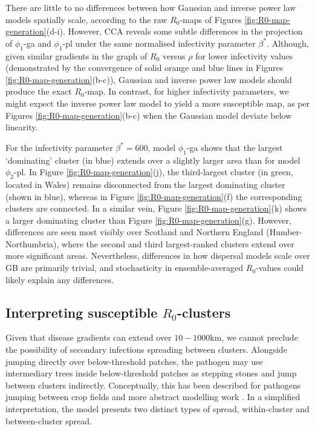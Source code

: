 There are little to no differences between how Gaussian and inverse power law models spatially scale, according to the raw $R_0$-maps of Figures \ref{fig:R0-map-generation}(d-i).
However, CCA reveals some subtle differences in the projection of $\phi_1$-ga and $\phi_1$-pl under the same normalised infectivity parameter $\beta^*$.
Although, given similar gradients in the graph of $R_0$ versus $\rho$ for lower infectivity values
(demonstrated by the convergence of solid orange and blue lines in Figures \ref{fig:R0-map-generation}(b-c)), 
Gaussian and inverse power law models should produce the exact $R_0$-map.
In contrast, for higher infectivity parameters, we might expect the inverse power law model to yield a more susceptible map, as per Figures \ref{fig:R0-map-generation}(b-c) when the Gaussian model deviate below linearity.

For the infectivity parameter $\beta^*=600$, model $\phi_1$-ga shows that the largest `dominating' cluster (in blue) extends over a slightly larger area than for model $\phi_2$-pl.
In Figure \ref{fig:R0-map-generation}(j), the third-largest cluster (in green, located in Wales) remains disconnected from the largest dominating cluster (shown in blue),
whereas in Figure \ref{fig:R0-map-generation}(f) the corresponding clusters are connected. 
In a similar vein, Figure \ref{fig:R0-map-generation}(k) shows a larger dominating cluster than Figure \ref{fig:R0-map-generation}(g).
However, differences are seen most visibly over Scotland and Northern England (Humber-Northumbria), where the second and third largest-ranked clusters extend over more significant areas.
Nevertheless, differences in how dispersal models scale over GB are primarily trivial, and stochasticity in ensemble-averaged $R_0$-values could likely explain any differences.

\subsection{Interpreting susceptible $R_0$-clusters}

Given that disease gradients can extend over $10-1000\mathrm{km}$, we cannot preclude the possibility of secondary infections spreading between clusters.
Alongside jumping directly over below-threshold patches, the pathogen may use intermediary trees inside below-threshold patches as stepping stones and jump between clusters indirectly. 
Conceptually, this has been described for pathogens jumping between crop fields \cite{Gilligan-disease-management} and more abstract modelling work \cite{wingen2013long}.
In a simplified interpretation, the model presents two distinct types of spread, within-cluster and between-cluster spread. 

